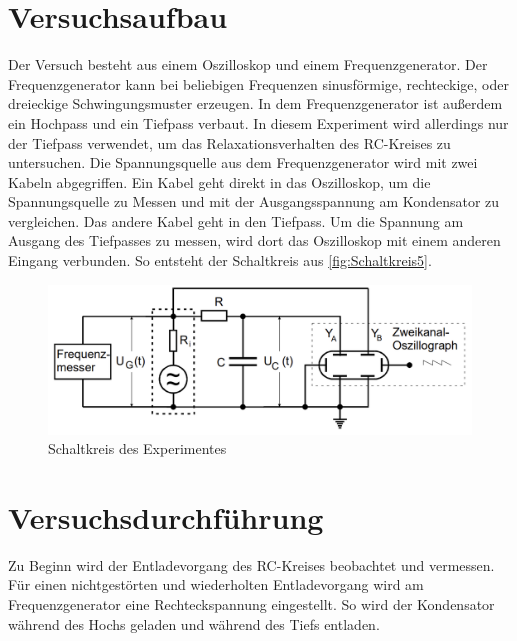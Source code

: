 %

%
\section{Versuchsaufbau}
Der Versuch besteht aus einem Oszilloskop und einem Frequenzgenerator.
Der Frequenzgenerator kann bei beliebigen Frequenzen sinusförmige, rechteckige, oder dreieckige Schwingungsmuster erzeugen.
In dem Frequenzgenerator ist außerdem ein Hochpass und ein Tiefpass verbaut. In diesem Experiment wird allerdings nur der 
Tiefpass verwendet, um das Relaxationsverhalten des RC-Kreises zu untersuchen.
Die Spannungsquelle aus dem Frequenzgenerator wird mit zwei Kabeln abgegriffen. Ein Kabel geht direkt in das Oszilloskop, 
um die Spannungsquelle zu Messen und mit der Ausgangsspannung am Kondensator zu vergleichen.
Das andere Kabel geht in den Tiefpass. Um die Spannung am Ausgang des Tiefpasses zu messen, wird dort das Oszilloskop mit 
einem anderen Eingang verbunden. So entsteht der Schaltkreis aus \autoref{fig:Schaltkreis5}.

\begin{figure}[H]
    \includegraphics[width=\textwidth]{./content/v353_Schaltkreise_5.png}
    \caption{Schaltkreis des Experimentes}
    \label{fig:Schaltkreis5}
\end{figure}


\section{Versuchsdurchführung}
Zu Beginn wird der Entladevorgang des RC-Kreises beobachtet und vermessen. Für einen nichtgestörten und wiederholten
Entladevorgang wird am Frequenzgenerator eine Rechteckspannung eingestellt. So wird der Kondensator während des Hochs 
geladen und während des Tiefs entladen.

